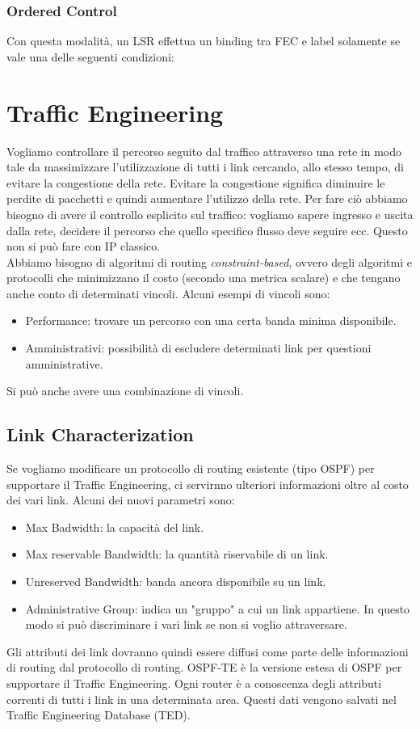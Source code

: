 \documentclass{article}
\begin{document}
\subsubsection{Ordered Control} Con questa modalità, un LSR effettua un binding tra FEC e label solamente se vale una delle seguenti condizioni:


\newpage
\section{Traffic Engineering}
Vogliamo controllare il percorso seguito dal traffico attraverso una rete in modo tale da massimizzare l'utilizzazione di tutti i link cercando, allo stesso tempo, di evitare la congestione della rete. Evitare la congestione significa diminuire le perdite di pacchetti e quindi aumentare l'utilizzo della rete. Per fare ciò abbiamo bisogno di avere il controllo esplicito sul traffico: vogliamo sapere ingresso e uscita dalla rete, decidere il percorso che quello specifico flusso deve seguire ecc. Questo non si può fare con IP classico.\\
Abbiamo bisogno di algoritmi di routing \textit{constraint-based}, ovvero degli algoritmi e protocolli che minimizzano il costo (secondo una metrica scalare) e che tengano anche conto di determinati vincoli. Alcuni esempi di vincoli sono:
\begin{itemize}
    \item Performance: trovare un percorso con una certa banda minima disponibile.
    \item Amministrativi: possibilità di escludere determinati link per questioni amministrative.
\end{itemize}
Si può anche avere una combinazione di vincoli.\\

\subsection{Link Characterization}
Se vogliamo modificare un protocollo di routing esistente (tipo OSPF) per supportare il Traffic Engineering, ci servirnno ulteriori informazioni oltre al costo dei vari link. Alcuni dei nuovi parametri sono:
\begin{itemize}
    \item Max Badwidth: la capacità del link.
    \item Max reservable Bandwidth: la quantità riservabile di un link.
    \item Unreserved Bandwidth: banda ancora disponibile su un link.
    \item Administrative Group: indica un "gruppo" a cui un link appartiene. In questo modo si può discriminare i vari link se non si voglio attraversare.
\end{itemize}
Gli attributi dei link dovranno quindi essere diffusi come parte delle informazioni di routing dal protocollo di routing. OSPF-TE è la versione estesa di OSPF per supportare il Traffic Engineering. Ogni router è a conoscenza degli attributi correnti di tutti i link in una determinata area. Questi dati vengono salvati nel Traffic Engineering Database (TED).
\end{document}
